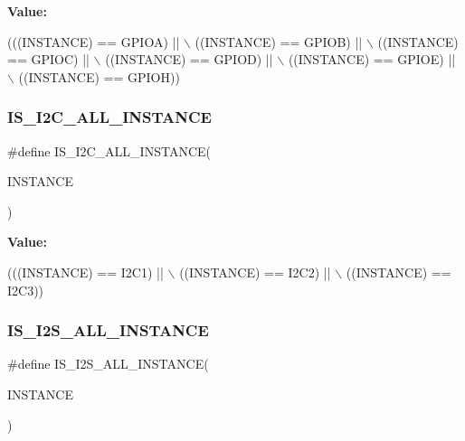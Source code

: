 {\bfseries Value\+:}
\begin{DoxyCode}
(((INSTANCE) == GPIOA) || \(\backslash\)
                                        ((INSTANCE) == GPIOB) || \(\backslash\)
                                        ((INSTANCE) == GPIOC) || \(\backslash\)
                                        ((INSTANCE) == GPIOD) || \(\backslash\)
                                        ((INSTANCE) == GPIOE) || \(\backslash\)
                                        ((INSTANCE) == GPIOH))
\end{DoxyCode}
\mbox{\label{group___exported__macros_gacdf0149a4e8c41a6814c13613c38a6b2}} 
\subsubsection{\texorpdfstring{I\+S\+\_\+\+I2\+C\+\_\+\+A\+L\+L\+\_\+\+I\+N\+S\+T\+A\+N\+CE}{IS\_I2C\_ALL\_INSTANCE}}
{\footnotesize\ttfamily \#define I\+S\+\_\+\+I2\+C\+\_\+\+A\+L\+L\+\_\+\+I\+N\+S\+T\+A\+N\+CE(\begin{DoxyParamCaption}\item[{}]{I\+N\+S\+T\+A\+N\+CE }\end{DoxyParamCaption})}

{\bfseries Value\+:}
\begin{DoxyCode}
(((INSTANCE) == I2C1) || \(\backslash\)
                                       ((INSTANCE) == I2C2) || \(\backslash\)
                                       ((INSTANCE) == I2C3))
\end{DoxyCode}
\mbox{\label{group___exported__macros_ga0b35685911e3c7a38ee89e5cdc5a82fa}} 
\subsubsection{\texorpdfstring{I\+S\+\_\+\+I2\+S\+\_\+\+A\+L\+L\+\_\+\+I\+N\+S\+T\+A\+N\+CE}{IS\_I2S\_ALL\_INSTANCE}}
{\footnotesize\ttfamily \#define I\+S\+\_\+\+I2\+S\+\_\+\+A\+L\+L\+\_\+\+I\+N\+S\+T\+A\+N\+CE(\begin{DoxyParamCaption}\item[{}]{I\+N\+S\+T\+A\+N\+CE }\end{DoxyParamCaption})}

